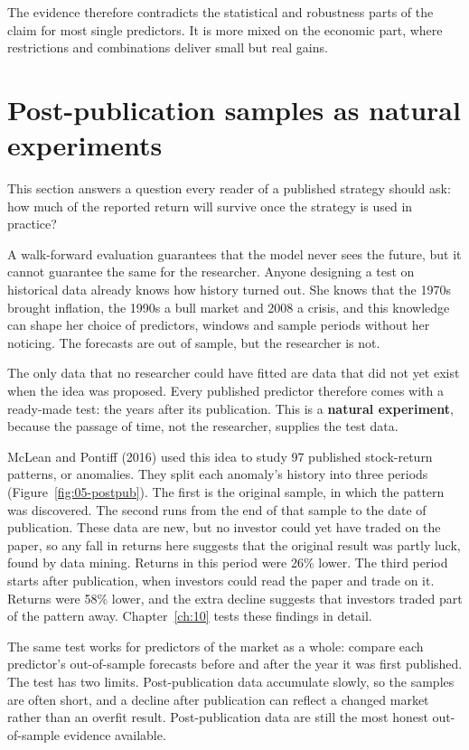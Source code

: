 The evidence therefore contradicts the statistical and robustness parts of the claim for most single predictors. It is more mixed on the economic part, where restrictions and combinations deliver small but real gains.

\section{Post-publication samples as natural experiments}
\label{sec:05-postpub}

This section answers a question every reader of a published strategy should ask: how much of the reported return will survive once the strategy is used in practice?

A walk-forward evaluation guarantees that the model never sees the future, but it cannot guarantee the same for the researcher. Anyone designing a test on historical data already knows how history turned out. She knows that the 1970s brought inflation, the 1990s a bull market and 2008 a crisis, and this knowledge can shape her choice of predictors, windows and sample periods without her noticing. The forecasts are out of sample, but the researcher is not.

The only data that no researcher could have fitted are data that did not yet exist when the idea was proposed. Every published predictor therefore comes with a ready-made test: the years after its publication. This is a \textbf{natural experiment}, because the passage of time, not the researcher, supplies the test data.

McLean and Pontiff (2016) used this idea to study 97 published stock-return patterns, or anomalies. They split each anomaly's history into three periods (Figure~\ref{fig:05-postpub}). The first is the original sample, in which the pattern was discovered. The second runs from the end of that sample to the date of publication. These data are new, but no investor could yet have traded on the paper, so any fall in returns here suggests that the original result was partly luck, found by data mining. Returns in this period were 26\% lower. The third period starts after publication, when investors could read the paper and trade on it. Returns were 58\% lower, and the extra decline suggests that investors traded part of the pattern away. Chapter~\ref{ch:10} tests these findings in detail.


The same test works for predictors of the market as a whole: compare each predictor's out-of-sample forecasts before and after the year it was first published. The test has two limits. Post-publication data accumulate slowly, so the samples are often short, and a decline after publication can reflect a changed market rather than an overfit result. Post-publication data are still the most honest out-of-sample evidence available.

